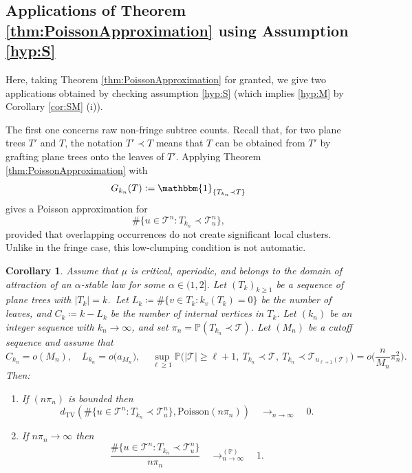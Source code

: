 \documentclass[a4paper,11pt]{article}
\newtheorem{corollary}[theorem]{Corollary}
\DeclareRobustCommand{\P}{\mathbb{P}}
\DeclareRobustCommand{\1}{\mathbf{1}}
\newcommand{\dTV}{d_{\mathrm{TV}}}
\newcommand{\T}{\mathcal{T}}
\newcommand{\Po}{\mathrm{Poisson}}
\begin{document}
\subsection{Applications of Theorem \ref{thm:PoissonApproximation} using Assumption \ref{hyp:S}}

Here, taking Theorem \ref{thm:PoissonApproximation}  for granted, we give two applications obtained by checking assumption \ref{hyp:S} (which implies \ref{hyp:M} by Corollary \ref{cor:SM} (i)).


The first one concerns raw non-fringe subtree counts. Recall that, for two plane
trees $T'$ and $T$, the notation $T'\prec T$ means that $T$ can be obtained
from $T'$ by grafting plane trees onto the leaves of $T'$. Applying Theorem
\ref{thm:PoissonApproximation} with
$$
G_{k_n}(T):=\mathbbm{1}_{\{T_{k_n}\prec T\}}
$$
gives a Poisson approximation for
$$
\#\{u\in\mathcal T^n : T_{k_n}\prec \mathcal T^n_u\},
$$
provided that overlapping occurrences do not create significant local
clusters. Unlike in the fringe case, this low-clumping condition is not
automatic.

\begin{corollary}\label{cor:Non-fringe Poisson}
    Assume that $\mu$ is critical, aperiodic, and belongs to the domain of
    attraction of an $\alpha$-stable law for some $\alpha\in(1,2]$. Let $(T_k)_{k\geq 1}$ be a sequence of plane trees with  $|T_{k}|=k$.\ Let $L_k\coloneqq \#\{v\in T_k:k_v(T_k)=0\}$ be the number of leaves, and $C_k\coloneqq k-L_k$ be the number of internal vertices in $T_k$. Let $(k_n)$ be an integer sequence with $k_n \to \infty$, and set $\pi_n = \P(T_{k_n}\prec \T)$. Let $(M_n)$ be a cutoff sequence and assume that
    $$
      C_{k_n}=o(M_n),
      \quad
      L_{k_n}=o\bigl(a_{M_n}\bigr), \quad \sup_{\ell\ge1} \P\bigl(
    |\mathcal T|\ge \ell+1,\
    T_{k_n} \prec\mathcal T,\
    T_{k_n} \prec \T_{u_{\ell+1}(\mathcal T)}
    \bigr) = o\Big( \frac{n}{M_n}\pi_n^2\Big ).
    $$
Then:
\begin{enumerate}
\item[(i)]
    If $(n\pi_n)$ is bounded 
    then
    \[
    \dTV \left(
            \#\{u\in\mathcal T^n : T_{k_n}\prec \mathcal T^n_u\},
            \Po(n\pi_n)
            \right)
            \quad \mathop{\longrightarrow}_{n \rightarrow \infty} \quad 0.
    \]
    \item[(ii)] If $n\pi_n\to\infty$ 
    then
$$
\frac{
\#\{u\in\mathcal T^n:T_{k_n}\prec\mathcal T^n_u\}
}{
n\pi_n
}
\quad \mathop{\longrightarrow}^{(\P)}_{n \rightarrow \infty} \quad 1.
$$
    \end{enumerate}
\end{corollary}
\end{document}
